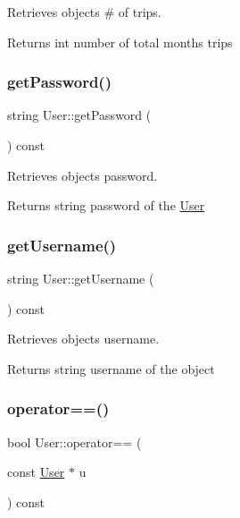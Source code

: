 Retrieves object\textquotesingle{}s \# of trips. 

\begin{DoxyReturn}{Returns}
int number of total month\textquotesingle{}s trips 
\end{DoxyReturn}
\mbox{\label{group___user_ga33429bdd1253091697a9c5c5e1448bee}} 
\subsubsection{\texorpdfstring{get\+Password()}{getPassword()}}
{\footnotesize\ttfamily string User\+::get\+Password (\begin{DoxyParamCaption}{ }\end{DoxyParamCaption}) const}



Retrieves object\textquotesingle{}s password. 

\begin{DoxyReturn}{Returns}
string password of the \hyperlink{class_user}{User} 
\end{DoxyReturn}
\mbox{\label{group___user_ga82e034043e04b2d750c654c8b2f2ce78}} 
\subsubsection{\texorpdfstring{get\+Username()}{getUsername()}}
{\footnotesize\ttfamily string User\+::get\+Username (\begin{DoxyParamCaption}{ }\end{DoxyParamCaption}) const}



Retrieves object\textquotesingle{}s username. 

\begin{DoxyReturn}{Returns}
string username of the object 
\end{DoxyReturn}
\mbox{\label{group___user_gab403e4acde558a3f968aa13b74960da5}} 
\subsubsection{\texorpdfstring{operator==()}{operator==()}}
{\footnotesize\ttfamily bool User\+::operator== (\begin{DoxyParamCaption}\item[{const \hyperlink{class_user}{User} $\ast$}]{u }\end{DoxyParamCaption}) const}



